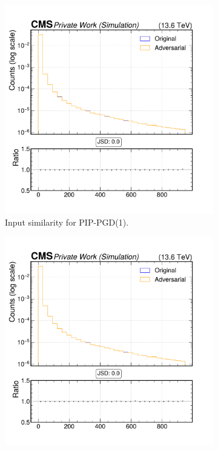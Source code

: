 \begin{figure}[h]
  \centering
  \begin{subfigure}[t]{0.32\textwidth}
    \includegraphics[width=\linewidth]{media/output/features/compare/combined_it_1/cmp_cpf_arr_Cpfcan_BtagPf_trackSip3dSig.pdf}
    \caption*{Input similarity for PIP-PGD(1).}
  \end{subfigure}\hfill
  \begin{subfigure}[t]{0.32\textwidth}
    \includegraphics[width=\linewidth]{media/output/features/compare/combined_it_2/cmp_cpf_arr_Cpfcan_BtagPf_trackSip3dSig.pdf}

\end{subfigure}
\end{figure}
